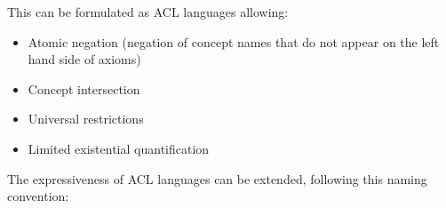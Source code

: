 
This can be formulated as ACL languages allowing:
\begin{itemize}
    \item Atomic negation (negation of concept names that do not appear on the left hand side of axioms)
    \item Concept intersection
    \item Universal restrictions
    \item Limited existential quantification
\end{itemize}

The expressiveness of ACL languages can be extended, following this naming convention:

